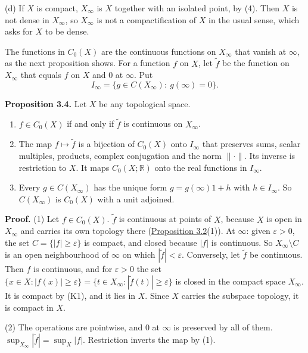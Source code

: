 \documentclass[
  english,
  11pt,
  a4paper,
]{article}
\providecommand{\tightlist}{%
  \setlength{\itemsep}{0pt}\setlength{\parskip}{0pt}}
\begin{document}
(d) If \(X\) is compact, \(X_\infty\) is \(X\) together with an isolated
point, by (4). Then \(X\) is not dense in \(X_\infty\), so \(X_\infty\)
is not a compactification of \(X\) in the usual sense, which asks for
\(X\) to be dense.

The functions in \(C_0(X)\) are the continuous functions on \(X_\infty\)
that vanish at \(\infty\), as the next proposition shows. For a function
\(f\) on \(X\), let \(\tilde f\) be the function on \(X_\infty\) that
equals \(f\) on \(X\) and \(0\) at \(\infty\). Put
\[I_\infty=\{g\in C(X_\infty):\ g(\infty)=0\}.\]

\textbf{Proposition 3.4.} Let \(X\) be any topological space.

\begin{enumerate}
\tightlist
\item
  \(f\in C_0(X)\) if and only if \(\tilde f\) is continuous on
  \(X_\infty\).
\item
  The map \(f\mapsto\tilde f\) is a bijection of \(C_0(X)\) onto
  \(I_\infty\) that preserves sums, scalar multiples, products, complex
  conjugation and the norm \(\|\cdot\|\). Its inverse is restriction to
  \(X\). It maps \(C_0(X;\mathbb R)\) onto the real functions in
  \(I_\infty\).
\item
  Every \(g\in C(X_\infty)\) has the unique form \(g=g(\infty)1+h\) with
  \(h\in I_\infty\). So \(C(X_\infty)\) is \(C_0(X)\) with a unit
  adjoined.
\end{enumerate}

\textbf{Proof.} (1) Let \(f\in C_0(X)\). \(\tilde f\) is continuous at
points of \(X\), because \(X\) is open in \(X_\infty\) and carries its
own topology there
(\hyperlink{the-stone-weierstrass-theorem-for-functions-vanishing-at-infinity--oa-fnd-sw-02}{Proposition
3.2}(1)). At \(\infty\): given \(\varepsilon>0\), the set
\(C=\{|f|\geq\varepsilon\}\) is compact, and closed because \(|f|\) is
continuous. So \(X_\infty\setminus C\) is an open neighbourhood of
\(\infty\) on which \(|\tilde f|<\varepsilon\). Conversely, let
\(\tilde f\) be continuous. Then \(f\) is continuous, and for
\(\varepsilon>0\) the set
\(\{x\in X:|f(x)|\geq\varepsilon\}=\{t\in X_\infty:|\tilde f(t)|\geq\varepsilon\}\)
is closed in the compact space \(X_\infty\). It is compact by (K1), and
it lies in \(X\). Since \(X\) carries the subspace topology, it is
compact in \(X\).

(2) The operations are pointwise, and \(0\) at \(\infty\) is preserved
by all of them. \(\sup_{X_\infty}|\tilde f|=\sup_X|f|\). Restriction
inverts the map by (1).
\end{document}
